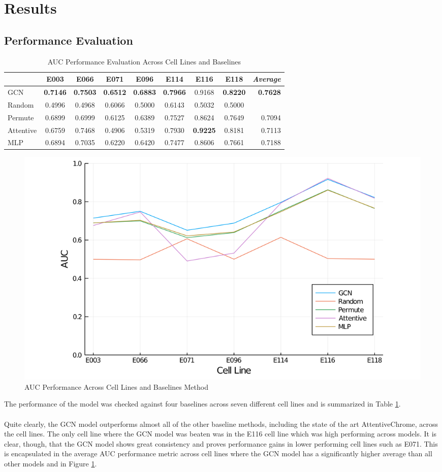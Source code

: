\section{Results}
\subsection{Performance Evaluation}
\begin{table}
    \centering
    \begin{tabular}{l || c | c | c | c | c | c | c || r}
        & E003 & E066 & E071 & E096 & E114 & E116 & E118 & \emph{Average}\\ \hline
        GCN & \textbf{0.7146} & \textbf{0.7503} & \textbf{0.6512} & \textbf{0.6883} & \textbf{0.7966} & 0.9168 & \textbf{0.8220} & \textbf{0.7628} \\
        Random & 0.4996 & 0.4968 & 0.6066 & 0.5000 & 0.6143 & 0.5032 & 0.5000 & \\
        Permute & 0.6899 & 0.6999 & 0.6125 & 0.6389 & 0.7527 & 0.8624 & 0.7649 & 0.7094 \\
        Attentive & 0.6759 & 0.7468 & 0.4906 & 0.5319 & 0.7930 & \textbf{0.9225} & 0.8181 & 0.7113 \\
        MLP & 0.6894 & 0.7035 & 0.6220 & 0.6420 & 0.7477 & 0.8606 & 0.7661 & 0.7188 
    \end{tabular}
    \caption{AUC Performance Evaluation Across Cell Lines and Baselines}
    \label{table:Table1}
\end{table}
\begin{figure}
    \centering
    \includegraphics[width=\textwidth]{images/performance.png}
    \caption{AUC Performance Across Cell Lines and Baselines Method}
    \label{figure:Figure1}
\end{figure}
The performance of the model was checked against four baselines across seven different cell lines and is summarized in Table \ref{table:Table1}. \\\\
Quite clearly, the GCN model outperforms almost all of the other baseline methods, including the state of the art AttentiveChrome, across the cell lines. The only cell line where the GCN model was beaten was in the E116 cell line which was high performing across models. It is clear, though, that the GCN model shows great consistency and proves performance gains in lower performing cell lines such as E071. This is encapsulated in the average AUC performance metric across cell lines where the GCN model has a significantly higher average than all other models and in Figure \ref{figure:Figure1}. 
